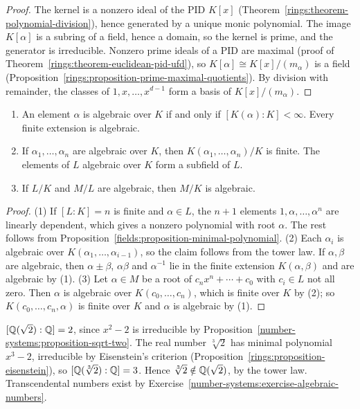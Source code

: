 \begin{proof}
The kernel is a nonzero ideal of the PID $K[x]$
(Theorem~\ref{rings:theorem-polynomial-division}), hence generated by a unique monic
polynomial. The image $K[\alpha]$ is a subring of a field, hence a domain, so the kernel is
prime, and the generator is irreducible. Nonzero prime ideals of a PID are maximal
(proof of Theorem~\ref{rings:theorem-euclidean-pid-ufd}), so $K[\alpha] \cong K[x]/(m_\alpha)$ is a
field (Proposition~\ref{rings:proposition-prime-maximal-quotients}). By division with
remainder, the classes of $1, x, \ldots, x^{d-1}$ form a basis of $K[x]/(m_\alpha)$.
\end{proof}

\begin{proposition}\label{fields:proposition-algebraic-closure-in-extension}
\begin{enumerate}
\item An element $\alpha$ is algebraic over $K$ if and only if $[K(\alpha) : K] < \infty$.
Every finite extension is algebraic.
\item If $\alpha_1, \ldots, \alpha_n$ are algebraic over $K$, then $K(\alpha_1, \ldots, \alpha_n)/K$ is
finite. The elements of $L$ algebraic over $K$ form a subfield of $L$.
\item If $L/K$ and $M/L$ are algebraic, then $M/K$ is algebraic.
\end{enumerate}
\end{proposition}

\begin{proof}
(1) If $[L : K] = n$ is finite and $\alpha \in L$, the $n + 1$ elements $1, \alpha, \ldots, \alpha^n$ are
linearly dependent, which gives a nonzero polynomial with root $\alpha$. The rest follows
from Proposition~\ref{fields:proposition-minimal-polynomial}.
(2) Each $\alpha_i$ is algebraic over $K(\alpha_1, \ldots, \alpha_{i-1})$, so the claim follows from the
tower law. If $\alpha, \beta$ are algebraic, then $\alpha \pm \beta$, $\alpha\beta$ and $\alpha^{-1}$ lie in the
finite extension $K(\alpha, \beta)$ and are algebraic by (1).
(3) Let $\alpha \in M$ be a root of $c_nx^n + \cdots + c_0$ with $c_i \in L$ not all zero. Then $\alpha$ is
algebraic over $K(c_0, \ldots, c_n)$, which is finite over $K$ by (2); so $K(c_0, \ldots, c_n, \alpha)$
is finite over $K$ and $\alpha$ is algebraic by (1).
\end{proof}

\begin{example}\label{fields:example-degrees}
$[\mathbb{Q}(\sqrt 2) : \mathbb{Q}] = 2$, since $x^2 - 2$ is irreducible by
Proposition~\ref{number-systems:proposition-sqrt-two}. The real number $\sqrt[3]{2}$ has
minimal polynomial $x^3 - 2$, irreducible by Eisenstein's criterion
(Proposition~\ref{rings:proposition-eisenstein}), so $[\mathbb{Q}(\sqrt[3]{2}) : \mathbb{Q}] = 3$. Hence
$\sqrt[3]{2} \notin \mathbb{Q}(\sqrt 2)$, by the tower law. Transcendental numbers exist by
Exercise~\ref{number-systems:exercise-algebraic-numbers}.
\end{example}

